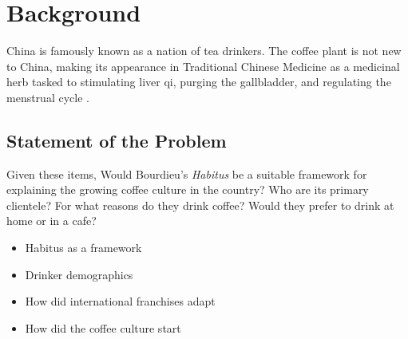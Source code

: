 \section{Background}\label{sec:background}

China is famously known as a nation of tea drinkers. The coffee plant is not new
to China, making its appearance in Traditional Chinese Medicine as a medicinal
herb tasked to stimulating liver qi, purging the gallbladder, and regulating the
menstrual cycle \autocite{dharmananda_coffee_2003}.

\subsection{Statement of the Problem}

Given these items, Would Bourdieu's \emph{Habitus} be a suitable framework for
explaining the growing coffee culture in the country? Who are its primary
clientele? For what reasons do they drink coffee? Would they prefer to drink at
home or in a cafe?

\begin{itemize}
	\item Habitus as a framework
	\item Drinker demographics
	\item How did international franchises adapt
	\item How did the coffee culture start
\end{itemize}
